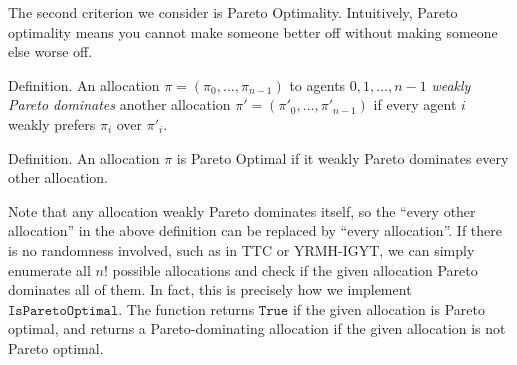\documentclass[12pt]{article}
\begin{document}
The second criterion we consider is Pareto Optimality. Intuitively, Pareto optimality means you cannot make someone better off without making someone else worse off. 

Definition. An allocation $\pi = (\pi_0,\dots,\pi_{n-1})$ to agents $0,1,\dots,n-1$ \textit{weakly Pareto dominates} another allocation $\pi' = (\pi'_0,\dots,\pi'_{n-1})$ if every agent $i$ weakly prefers $\pi_i$ over $\pi'_i$.

Definition. An allocation $\pi$ is Pareto Optimal if it  weakly Pareto dominates every other allocation.

Note that any allocation weakly Pareto dominates itself, so the ``every other allocation'' in the above definition can be replaced by ``every allocation''. If there is no randomness involved, such as in TTC or YRMH-IGYT, we can simply enumerate all $n!$ possible allocations and check if the given allocation Pareto dominates all of them. In fact, this is precisely how we implement $\texttt{IsParetoOptimal}$. The function returns $\texttt{True}$ if the given allocation is Pareto optimal, and returns a Pareto-dominating allocation if the given allocation is not Pareto optimal. 
\end{document}
